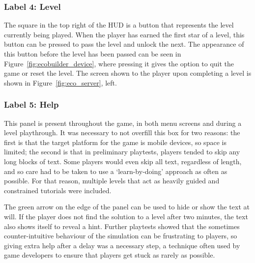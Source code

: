 \subsubsection{Label 4: Level}
The square in the top right of the HUD is a button that represents the level currently being played. When the player has earned the first star of a level, this button can be pressed to pass the level and unlock the next. The appearance of this button before the level has been passed can be seen in Figure~\ref{fig:ecobuilder_device}, where pressing it gives the option to quit the game or reset the level. The screen shown to the player upon completing a level is shown in Figure~\ref{fig:eco_server}, left.

\subsubsection{Label 5: Help}
This panel is present throughout the game, in both menu screens and during a level playthrough. It was necessary to not overfill this box for two reasons: the first is that the target platform for the game is mobile devices, so space is limited; the second is that in preliminary playtests, players tended to skip any long blocks of text. Some players would even skip all text, regardless of length, and so care had to be taken to use a `learn-by-doing' approach as often as possible. For that reason, multiple levels that act as heavily guided and constrained tutorials were included.

The green arrow on the edge of the panel can be used to hide or show the text at will.
If the player does not find the solution to a level after two minutes, the text also shows itself to reveal a hint. Further playtests showed that the sometimes counter-intuitive behaviour of the simulation can be frustrating to players, so giving extra help after a delay was a necessary step, a technique often used by game developers to ensure that players get stuck as rarely as possible.


